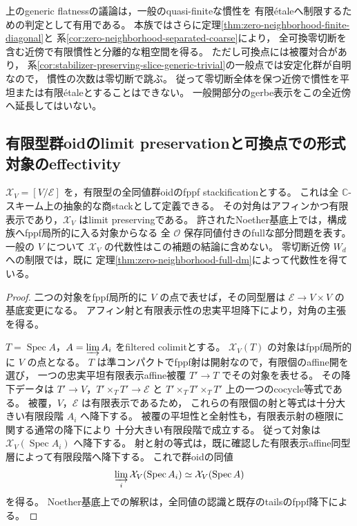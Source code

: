 \begin{remark}[有限慣性と平坦な慣性の違い]
上のgeneric flatnessの議論は，一般のquasi-finiteな慣性を
有限\'{e}taleへ制限するための判定として有用である。
本族ではさらに定理\ref{thm:zero-neighborhood-finite-diagonal}と
系\ref{cor:zero-neighborhood-separated-coarse}により，
全可換零切断を含む近傍で有限慣性と分離的な粗空間を得る。
ただし可換点には被覆対合があり，
系\ref{cor:stabilizer-preserving-slice-generic-trivial}の一般点では安定化群が自明なので，
慣性の次数は零切断で跳ぶ。
従って零切断全体を保つ近傍で慣性を平坦または有限\'{e}taleとすることはできない。
一般開部分のgerbe表示をこの全近傍へ延長してはいない。
\end{remark}


\subsection{有限型群oidのlimit preservationと可換点での形式対象のeffectivity}

\begin{lemma}\label{lem:finite-groupoid-limit-preserving}
$\mathcal X_V=[V/\mathcal E]$ を，有限型の全同値群oidのfppf stackificationとする。
これは全 $\mathbb C$-スキーム上の抽象的な商stackとして定義できる。
その対角はアフィンかつ有限表示であり，$\mathcal X_V$ はlimit preservingである。
許されたNoether基底上では，構成族へfppf局所的に入る対象からなる
全 $\mathcal O$ 保存同値付きのfullな部分問題を表す。
一般の $V$ について $\mathcal X_V$ の代数性はこの補題の結論に含めない。
零切断近傍 $W_d$ への制限では，既に
定理\ref{thm:zero-neighborhood-full-dm}によって代数性を得ている。
\end{lemma}
\begin{proof}
二つの対象をfppf局所的に $V$ の点で表せば，その同型層は
$\mathcal E\to V\times V$ の基底変更になる。
アフィン射と有限表示性の忠実平坦降下により，対角の主張を得る。

$T=\operatorname{Spec}A$，$A=\varinjlim A_i$ をfiltered colimitとする。
$\mathcal X_V(T)$ の対象はfppf局所的に $V$ の点となる。
$T$ は準コンパクトでfppf射は開射なので，有限個のaffine開を選び，
一つの忠実平坦有限表示affine被覆 $T'\to T$ でその対象を表せる。
その降下データは $T'\to V$，$T'\times_TT'\to\mathcal E$ と
$T'\times_TT'\times_TT'$ 上の一つのcocycle等式である。
被覆，$V$，$\mathcal E$ は有限表示であるため，
これらの有限個の射と等式は十分大きい有限段階 $A_i$ へ降下する。
被覆の平坦性と全射性も，有限表示射の極限に関する通常の降下により
十分大きい有限段階で成立する。
従って対象は $\mathcal X_V(\operatorname{Spec}A_i)$ へ降下する。
射と射の等式は，既に確認した有限表示affine同型層によって有限段階へ降下する。
これで群oidの同値
\[
 \varinjlim_i\mathcal X_V(\operatorname{Spec}A_i)
     \simeq\mathcal X_V(\operatorname{Spec}A)
\]
を得る。
Noether基底上での解釈は，全同値の認識と既存のtailsのfppf降下による。
\end{proof}

